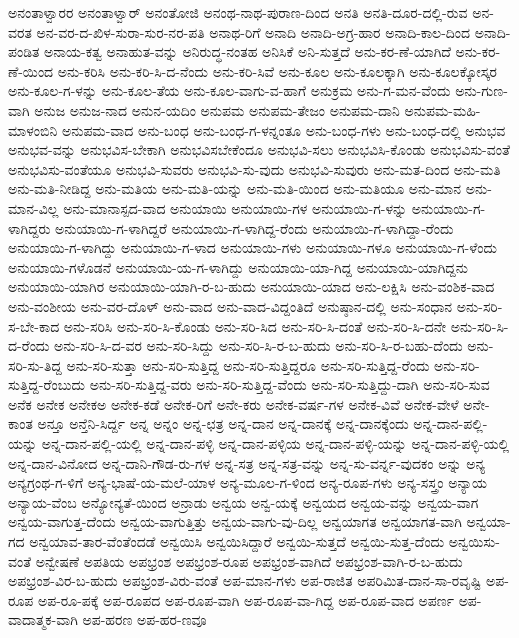 ಅನಂತಾಳ್ವಾರರ
ಅನಂತಾಳ್ವಾರ್
ಅನಂತೋಜಿ
ಅನಂಥ-ನಾಥ-ಪುರಾಣ-ದಿಂದ
ಅನತಿ
ಅನತಿ-ದೂರ-ದಲ್ಲಿ-ರುವ
ಅನ-ವರತ
ಅನ-ವರ-ದ-ಖಿಳ-ಸುರಾ-ಸುರ-ನರ-ಪತಿ
ಅನಾಥ-ರಿಗೆ
ಅನಾದಿ
ಅನಾದಿ-ಅಗ್ರ-ಹಾರ
ಅನಾದಿ-ಕಾಲ-ದಿಂದ
ಅನಾದಿ-ಪಂಡಿತ
ಅನಾಯ-ಕತ್ವ
ಅನಾಹುತ-ವನ್ನು
ಅನಿರುದ್ಧ-ನಂತಹ
ಅನಿಸಿಕೆ
ಅನಿ-ಸುತ್ತದೆ
ಅನು-ಕರ-ಣೆ-ಯಾಗಿದೆ
ಅನು-ಕರ-ಣೆ-ಯಿಂದ
ಅನು-ಕರಿಸಿ
ಅನು-ಕರಿ-ಸಿ-ದ-ನೆಂದು
ಅನು-ಕರಿ-ಸಿವೆ
ಅನು-ಕೂಲ
ಅನು-ಕೂಲಕ್ಕಾಗಿ
ಅನು-ಕೂಲಕ್ಕೋಸ್ಕರ
ಅನು-ಕೂಲ-ಗ-ಳನ್ನು
ಅನು-ಕೂಲ-ತೆಯ
ಅನು-ಕೂಲ-ವಾಗು-ವ-ಹಾಗೆ
ಅನುಕ್ರಮ
ಅನು-ಗ-ಮನ-ವೆಂದು
ಅನು-ಗುಣ-ವಾಗಿ
ಅನುಜ
ಅನುಜ-ನಾದ
ಅನುನ-ಯದಿಂ
ಅನುಪಮ
ಅನುಪಮ-ತೇಜಂ
ಅನುಪಮ-ದಾನಿ
ಅನುಪಮ-ಮಹಿ-ಮಾಳಂಬಿನಿ
ಅನುಪಮ-ವಾದ
ಅನು-ಬಂಧ
ಅನು-ಬಂಧ-ಗ-ಳನ್ನಂತೂ
ಅನು-ಬಂಧ-ಗಳು
ಅನು-ಬಂಧ-ದಲ್ಲಿ
ಅನುಭವ
ಅನುಭವ-ವನ್ನು
ಅನುಭವಿಸ-ಬೇಕಾಗಿ
ಅನುಭವಿಸಬೇಕೆಂದೂ
ಅನುಭವಿ-ಸಲು
ಅನುಭವಿಸಿ-ಕೊಂಡು
ಅನುಭವಿಸು-ವಂತೆ
ಅನುಭವಿಸು-ವಂತೆಯೂ
ಅನುಭವಿ-ಸುವರು
ಅನುಭವಿ-ಸು-ವುದು
ಅನುಭವಿ-ಸುವುರು
ಅನು-ಮತ-ದಿಂದ
ಅನು-ಮತಿ
ಅನು-ಮತಿ-ನೀಡಿದ್ದ
ಅನು-ಮತಿಯ
ಅನು-ಮತಿ-ಯನ್ನು
ಅನು-ಮತಿ-ಯಿಂದ
ಅನು-ಮತಿಯೂ
ಅನು-ಮಾನ
ಅನು-ಮಾನ-ವಿಲ್ಲ
ಅನು-ಮಾನಾಸ್ಪದ-ವಾದ
ಅನುಯಾಯಿ
ಅನುಯಾಯಿ-ಗಳ
ಅನುಯಾಯಿ-ಗ-ಳನ್ನು
ಅನುಯಾಯಿ-ಗ-ಳಾಗಿದ್ದರು
ಅನುಯಾಯಿ-ಗ-ಳಾಗಿದ್ದರೆ
ಅನುಯಾಯಿ-ಗ-ಳಾಗಿದ್ದ-ರೆಂದು
ಅನುಯಾಯಿ-ಗ-ಳಾಗಿದ್ದಾ-ರೆಂದು
ಅನುಯಾಯಿ-ಗ-ಳಾಗಿದ್ದು
ಅನುಯಾಯಿ-ಗ-ಳಾದ
ಅನುಯಾಯಿ-ಗಳು
ಅನುಯಾಯಿ-ಗಳೂ
ಅನುಯಾಯಿ-ಗ-ಳೆಂದು
ಅನುಯಾಯಿ-ಗಳೊಡನೆ
ಅನುಯಾಯಿ-ಯ-ಗ-ಳಾಗಿದ್ದು
ಅನುಯಾಯಿ-ಯಾ-ಗಿದ್ದ
ಅನುಯಾಯಿ-ಯಾಗಿದ್ದನು
ಅನುಯಾಯಿ-ಯಾಗಿರ
ಅನುಯಾಯಿ-ಯಾಗಿ-ರ-ಬ-ಹುದು
ಅನುಯಾಯಿ-ಯಾದ
ಅನು-ಲಕ್ಷಿಸಿ
ಅನು-ವಂಶಿಕ-ವಾದ
ಅನು-ವಂಶೀಯ
ಅನು-ವರ-ದೊಳ್
ಅನು-ವಾದ
ಅನು-ವಾದ-ವಿದ್ದಂತಿದೆ
ಅನುಷ್ಠಾನ-ದಲ್ಲಿ
ಅನು-ಸಂಧಾನ
ಅನು-ಸರಿ-ಸ-ಬೇ-ಕಾದ
ಅನು-ಸರಿಸಿ
ಅನು-ಸರಿ-ಸಿ-ಕೊಂಡು
ಅನು-ಸರಿ-ಸಿದ
ಅನು-ಸರಿ-ಸಿ-ದಂತೆ
ಅನು-ಸರಿ-ಸಿ-ದನೇ
ಅನು-ಸರಿ-ಸಿ-ದ-ರೆಂದು
ಅನು-ಸರಿ-ಸಿ-ದ-ವರ
ಅನು-ಸರಿ-ಸಿದ್ದು
ಅನು-ಸರಿ-ಸಿ-ರ-ಬ-ಹುದು
ಅನು-ಸರಿ-ಸಿ-ರ-ಬಹು-ದೆಂದು
ಅನು-ಸರಿ-ಸು-ತಿದ್ದ
ಅನು-ಸರಿ-ಸುತ್ತಾ
ಅನು-ಸರಿ-ಸುತ್ತಿದ್ದ
ಅನು-ಸರಿ-ಸುತ್ತಿದ್ದರೂ
ಅನು-ಸರಿ-ಸುತ್ತಿದ್ದ-ರೆಂದು
ಅನು-ಸರಿ-ಸುತ್ತಿದ್ದ-ರೆಂಬುದು
ಅನು-ಸರಿ-ಸುತ್ತಿದ್ದ-ವರು
ಅನು-ಸರಿ-ಸುತ್ತಿದ್ದ-ವೆಂದು
ಅನು-ಸರಿ-ಸುತ್ತಿದ್ದು-ದಾಗಿ
ಅನು-ಸರಿ-ಸುವ
ಅನೆಕ
ಅನೇಕ
ಅನೇಕಅ
ಅನೇಕ-ಕಡೆ
ಅನೇಕ-ರಿಗೆ
ಅನೇ-ಕರು
ಅನೇಕ-ವರ್ಷ-ಗಳ
ಅನೇಕ-ವಿವೆ
ಅನೇಕ-ವೇಳೆ
ಅನೇ-ಕಾಂತ
ಅನ್ತೂ
ಅನ್ತೆನಿ-ಸಿರ್ದ್ದ
ಅನ್ನ
ಅನ್ನಂ
ಅನ್ನ-ಛತ್ರ
ಅನ್ನ-ದಾನ
ಅನ್ನ-ದಾನಕ್ಕೆ
ಅನ್ನ-ದಾನಕ್ಕೆಂದು
ಅನ್ನ-ದಾನ-ಪಲ್ಲಿ-ಯನ್ನು
ಅನ್ನ-ದಾನ-ಪಲ್ಲಿ-ಯಲ್ಲಿ
ಅನ್ನ-ದಾನ-ಪಳ್ಳಿ
ಅನ್ನ-ದಾನ-ಪಳ್ಳಿಯ
ಅನ್ನ-ದಾನ-ಪಳ್ಳಿ-ಯನ್ನು
ಅನ್ನ-ದಾನ-ಪಳ್ಳಿ-ಯಲ್ಲಿ
ಅನ್ನ-ದಾನ-ವಿನೋದ
ಅನ್ನ-ದಾನಿ-ಗೌಡ-ರು-ಗಳ
ಅನ್ನ-ಸತ್ರ
ಅನ್ನ-ಸತ್ರ-ವನ್ನು
ಅನ್ನ-ಸು-ವರ್ನ್ನ-ವುದಕಂ
ಅನ್ನು
ಅನ್ಯ
ಅನ್ಯಗ್ರಂಥ-ಗ-ಳಿಗೆ
ಅನ್ಯ-ಭಾಷೆ-ಯ-ಮಲೆ-ಯಾಳ
ಅನ್ಯ-ಮೂಲ-ಗ-ಳಿಂದ
ಅನ್ಯ-ರೂಪ-ಗಳು
ಅನ್ಯ-ಸಸ್ತ್ರಂ
ಅನ್ಯಾಯ
ಅನ್ಯಾಯ-ವೆಂಬ
ಅನ್ಯೋನ್ಯತೆ-ಯಿಂದ
ಅನ್ರಾಡು
ಅನ್ವಯ
ಅನ್ವ-ಯಕ್ಕೆ
ಅನ್ವಯದ
ಅನ್ವಯ-ವನ್ನು
ಅನ್ವಯ-ವಾಗ
ಅನ್ವಯ-ವಾಗುತ್ತ-ದೆಂದು
ಅನ್ವಯ-ವಾಗುತ್ತಿತ್ತು
ಅನ್ವಯ-ವಾಗು-ವು-ದಿಲ್ಲ
ಅನ್ವಯಾಗತ
ಅನ್ವಯಾಗತ-ವಾಗಿ
ಅನ್ವಯಾ-ಗದ
ಅನ್ವಯಾವ-ತಾರ-ವೆಂತೆಂದಡೆ
ಅನ್ವಯಿಸಿ
ಅನ್ವಯಿಸಿದ್ದಾರೆ
ಅನ್ವಯಿ-ಸುತ್ತದೆ
ಅನ್ವಯಿ-ಸುತ್ತ-ದೆಂದು
ಅನ್ವಯಿಸು-ವಂತೆ
ಅನ್ವೇಷಣೆ
ಅಪತಿಯ
ಅಪಭ್ರಂಶ
ಅಪಭ್ರಂಶ-ರೂಪ
ಅಪಭ್ರಂಶ-ವಾಗಿದೆ
ಅಪಭ್ರಂಶ-ವಾಗಿ-ರ-ಬ-ಹುದು
ಅಪಭ್ರಂಶ-ವಿರ-ಬ-ಹುದು
ಅಪಭ್ರಂಶ-ವಿರು-ವಂತೆ
ಅಪ-ಮಾನ-ಗಳು
ಅಪ-ರಾಜಿತ
ಅಪರಿಮಿತ-ದಾನ-ಸಾ-ರವೃಷ್ಟಿ
ಅಪ-ರೂಪ
ಅಪ-ರೂ-ಪಕ್ಕೆ
ಅಪ-ರೂಪದ
ಅಪ-ರೂಪ-ವಾಗಿ
ಅಪ-ರೂಪ-ವಾ-ಗಿದ್ದ
ಅಪ-ರೂಪ-ವಾದ
ಅಪರ್ಣ
ಅಪ-ವಾದಾತ್ಮಕ-ವಾಗಿ
ಅಪ-ಹರಣ
ಅಪ-ಹರ-ಣವೂ
